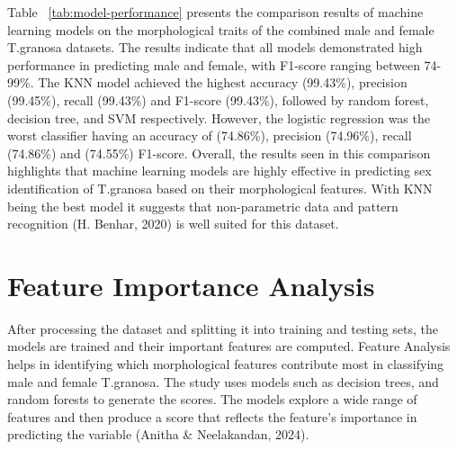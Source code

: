 \begin{table}[H]
	\centering
	\caption{Model Performance Comparison}
	\label{tab:model-performance}
\end{table}

Table ~\ref{tab:model-performance} presents the comparison results of machine learning models on the morphological traits of the combined  male and female T.granosa datasets. The results indicate that all models demonstrated high performance in predicting male and female, with F1-score ranging between 74-99\%. The KNN model achieved the highest accuracy (99.43\%), precision (99.45\%), recall (99.43\%) and F1-score (99.43\%), followed by random forest, decision tree, and SVM respectively. However, the logistic regression was the worst classifier having an accuracy of (74.86\%), precision (74.96\%), recall (74.86\%) and (74.55\%) F1-score. Overall, the results seen in this comparison highlights that machine learning models are highly effective in predicting sex identification of T.granosa based on their morphological features. With KNN being the best model it suggests that non-parametric data and pattern recognition (H. Benhar, 2020) is well suited for this dataset. 

\section{Feature Importance Analysis}
After processing the dataset and splitting it into training and testing sets, the models are trained and their important features are computed. Feature Analysis helps in identifying which morphological features contribute most in classifying male and female T.granosa. The study uses models such as decision trees, and random forests to generate the scores. The models explore a wide range of features and then produce a score that reflects the feature’s importance in predicting the variable (Anitha \& Neelakandan, 2024).  

